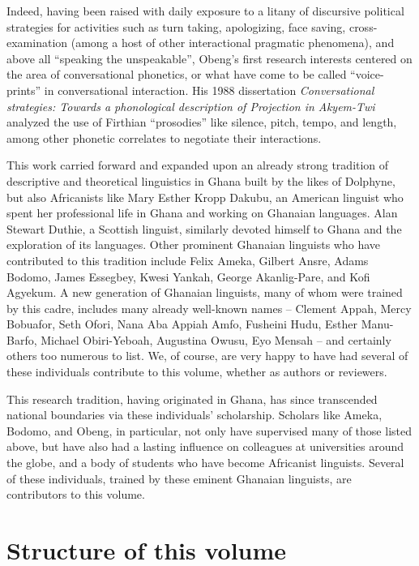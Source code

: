 \documentclass[output=paper,colorlinks,citecolor=brown]{langscibook}
\begin{document}
Indeed, having been raised with daily exposure to a litany of discursive political strategies for activities such as turn taking, apologizing, face saving, cross-examination (among a host of other interactional pragmatic phenomena), and above all ``speaking the unspeakable'', Obeng's first research interests centered on the area of conversational phonetics, or what have come to be called ``voice-prints'' in conversational interaction. His 1988 dissertation \textit{Conversational strategies: Towards a phonological description of Projection in Akyem-Twi} analyzed the use of Firthian ``prosodies'' like silence, pitch, tempo, and length, among other phonetic correlates to negotiate their interactions.

This work carried forward and expanded upon an already strong tradition of descriptive and theoretical linguistics in Ghana built by the likes of Dolphyne, but also Africanists like Mary Esther Kropp Dakubu, an American linguist who spent her professional life in Ghana and working on Ghanaian languages. Alan Stewart Duthie, a Scottish linguist, similarly devoted himself to Ghana and the exploration of its languages. Other prominent Ghanaian linguists who have contributed to this tradition include Felix Ameka, Gilbert Ansre, Adams Bodomo, James Essegbey, Kwesi Yankah, George Akanlig-Pare, and Kofi Agyekum. A new generation of Ghanaian linguists, many of whom were trained by this cadre, includes many already well-known names -- Clement Appah, Mercy Bobuafor, Seth Ofori, Nana Aba Appiah Amfo, Fusheini Hudu, Esther Manu-Barfo, Michael Obiri-Yeboah, Augustina Owusu, Eyo Mensah -- and certainly others too numerous to list. We, of course, are very happy to have had several of these individuals contribute to this volume, whether as authors or reviewers.

This research tradition, having originated in Ghana, has since transcended national boundaries via these individuals' scholarship. Scholars like Ameka, Bodomo, and Obeng, in particular, not only have supervised many of those listed above, but have also had a lasting influence on colleagues at universities around the globe, and a body of students who have become Africanist linguists. Several of these individuals, trained by these eminent Ghanaian linguists, are contributors to this volume.


\section{Structure of this volume}
\end{document}

